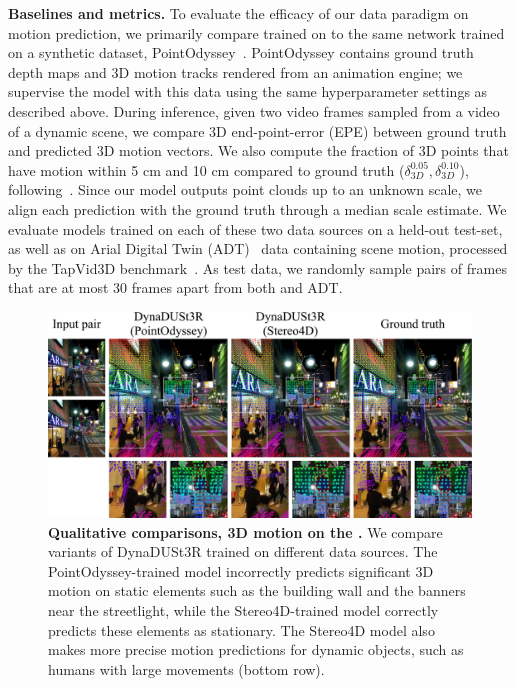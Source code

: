 \noindent \textbf{Baselines and metrics.} 
To evaluate the efficacy of our data paradigm on motion prediction, we primarily compare \method trained on \dataset to the same network trained on a synthetic dataset, PointOdyssey~\cite{zheng2023point}. 
PointOdyssey contains ground truth depth maps and 3D motion tracks rendered from an animation engine;
we supervise the model with this data using the same hyperparameter settings as described above. 
During inference, given two video frames sampled from a video of a dynamic scene, we compare 3D end-point-error (EPE) between ground truth and predicted 3D motion vectors. 
We also 
compute the fraction of 3D points that have motion within 5 cm and 10 cm compared to ground truth ($\delta_{3D}^{0.05}, \delta_{3D}^{0.10}$), following~\cite{teed2021raft3d,wang2024shape}. 
Since our model outputs point clouds up to an unknown scale, we align each prediction with the ground truth through a median scale estimate.
We evaluate models trained on each of these two data sources on a held-out \dataset test-set, as well as on Arial Digital Twin (ADT)~\cite{pan2023aria} data containing scene motion, processed by the TapVid3D benchmark~\cite{koppula2024tapvid3d}. 
As test data, we randomly sample pairs of frames that are at most 30 frames apart from both \dataset and ADT.




\begin{figure}[ht]
    \centering
    \includegraphics[width=\linewidth]{fig/qualitative_comparison_on_motion_stereo4d.pdf}
    \caption{\textbf{Qualitative comparisons, 3D motion on the \dataset.} We compare variants of DynaDUSt3R trained on different data sources. The PointOdyssey-trained model incorrectly predicts significant 3D motion on static elements such as the building wall and the banners near the streetlight, while the Stereo4D-trained model correctly predicts these elements as stationary. The Stereo4D model also makes more precise motion predictions for dynamic objects, such as humans with large movements (bottom row).}
    \label{fig:compare-stereo4d}
\end{figure}


